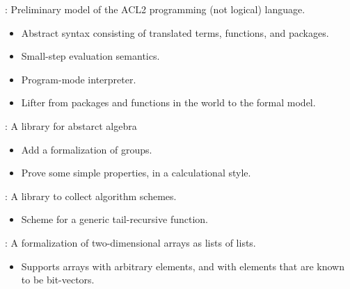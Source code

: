 
\begin{frame}[fragile]

\newlibtitle

:
Preliminary model of the ACL2 programming (not logical) language.
\begin{itemize}
\item Abstract syntax consisting of translated terms, functions, and packages.
\item Small-step evaluation semantics.
\item Program-mode interpreter.
\item Lifter from packages and functions in the world to the formal model.
\end{itemize}

\end{frame}

\begin{frame}

\newlibtitle

:
A library for abstarct algebra
\begin{itemize}
\item Add a formalization of groups.
\item Prove some simple properties, in a calculational style.
\end{itemize}

\end{frame}


\begin{frame}

\newlibtitle

:
A library to collect algorithm schemes.
\begin{itemize}
\item Scheme for a generic tail-recursive function.
\end{itemize}

\end{frame}


\begin{frame}

\newlibtitle

:
A formalization of two-dimensional arrays as lists of lists.
\begin{itemize}
\item Supports arrays with arbitrary elements, and with elements that
  are known to be bit-vectors.
\end{itemize}

\end{frame}

